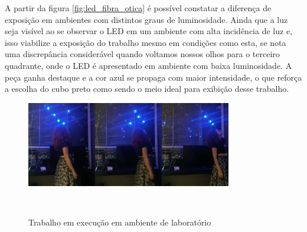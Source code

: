 A partir da figura \ref{fig:led_fibra_otica} é possível constatar a diferença de exposição em ambientes com distintos graus de luminosidade. Ainda que a luz seja visível ao se observar o LED em um ambiente com alta incidência de luz e, isso viabilize a exposição do trabalho mesmo em condições como esta, se nota uma discrepância considerável quando voltamos nossos olhos para o terceiro quadrante, onde o LED é apresentado em ambiente com baixa luminosidade. A peça ganha destaque e a cor azul se propaga com maior intensidade, o que reforça a escolha do cubo preto como sendo o meio ideal para exibição desse trabalho.

   
\begin{figure}[H]
  \begin{center}
    \caption{Trabalho em execução em ambiente de laboratório}
    \vspace*{0,2cm}
    \includegraphics[width=0.8\textwidth]{./04-figuras/trabalho}
    \label{fig:trabalho}
  \end{center}
  \vspace*{-0,9cm}
  \\
\end{figure}
